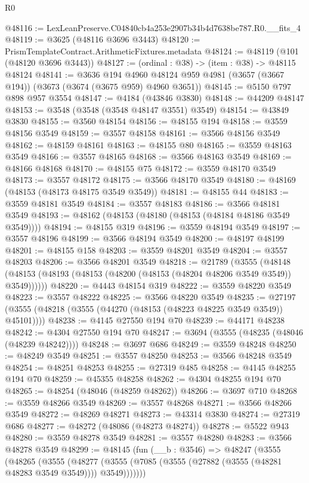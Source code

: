 \begin{lexlean}{R0}
\begin{coremodule}
@48116 := LexLeanPreserve.C04840cb4a253e2907b34b4d7638be787.R0.__fits_4
@48119 := @3625 (@48116 @3696 @3443)
@48120 := PrismTemplateContract.ArithmeticFixtures.metadata
@48124 := @48119 (@101 (@48120 @3696 @3443))
@48127 := (ordinal : @38) -> (item : @38) -> @48115 @48124
@48141 := @3636
    @194
    @4960
    @48124
    @959
    @4981
    (@3657 (@3667 @194))
    (@3673 (@3674 (@3675 @959) @4960 @3651))
@48145 := @5150 @797 @898 @957 @3554
@48147 := @4184 (@43846 @3830)
@48148 := @44209 @48147
@48153 := @3548 (@3548 (@3548 @48147 @3551) @3549)
@48154 := @43849 @3830
@48155 := @3560 @48154
@48156 := @48155 @194
@48158 := @3559 @48156 @3549
@48159 := @3557 @48158
@48161 := @3566 @48156 @3549
@48162 := @48159 @48161
@48163 := @48155 @80
@48165 := @3559 @48163 @3549
@48166 := @3557 @48165
@48168 := @3566 @48163 @3549
@48169 := @48166 @48168
@48170 := @48155 @75
@48172 := @3559 @48170 @3549
@48173 := @3557 @48172
@48175 := @3566 @48170 @3549
@48180 := @48169 (@48153 (@48173 @48175 @3549 @3549))
@48181 := @48155 @44
@48183 := @3559 @48181 @3549
@48184 := @3557 @48183
@48186 := @3566 @48181 @3549
@48193 := @48162 (@48153 (@48180 (@48153 (@48184 @48186 @3549 @3549))))
@48194 := @48155 @319
@48196 := @3559 @48194 @3549
@48197 := @3557 @48196
@48199 := @3566 @48194 @3549
@48200 := @48197 @48199
@48201 := @48155 @158
@48203 := @3559 @48201 @3549
@48204 := @3557 @48203
@48206 := @3566 @48201 @3549
@48218 := @21789
    (@3555 (@48148 (@48153 (@48193 (@48153 (@48200 (@48153 (@48204 @48206 @3549 @3549)) @3549))))))
@48220 := @4443 @48154 @319
@48222 := @3559 @48220 @3549
@48223 := @3557 @48222
@48225 := @3566 @48220 @3549
@48235 := @27197 (@3555 (@48218 (@3555 (@44270 (@48153 (@48223 @48225 @3549 @3549)) @45101))))
@48238 := @4145 @27550 @194 @70
@48239 := @44171 @48238
@48242 := @4304 @27550 @194 @70
@48247 := @3694 (@3555 (@48235 (@48046 (@48239 @48242))))
@48248 := @3697 @686
@48249 := @3559 @48248
@48250 := @48249 @3549
@48251 := @3557 @48250
@48253 := @3566 @48248 @3549
@48254 := @48251 @48253
@48255 := @27319 @485
@48258 := @4145 @48255 @194 @70
@48259 := @45355 @48258
@48262 := @4304 @48255 @194 @70
@48265 := @48254 (@48046 (@48259 @48262))
@48266 := @3697 @710
@48268 := @3559 @48266 @3549
@48269 := @3557 @48268
@48271 := @3566 @48266 @3549
@48272 := @48269 @48271
@48273 := @43314 @3830
@48274 := @27319 @686
@48277 := @48272 (@48086 (@48273 @48274))
@48278 := @5522 @943
@48280 := @3559 @48278 @3549
@48281 := @3557 @48280
@48283 := @3566 @48278 @3549
@48299 := @48145
    (fun (__b : @3546) =>
    @48247
      (@3555
        (@48265
          (@3555
            (@48277 (@3555 (@7085 (@3555 (@27882 (@3555 (@48281 @48283 @3549 @3549)))) @3549)))))))

\end{coremodule}
\end{lexlean}
